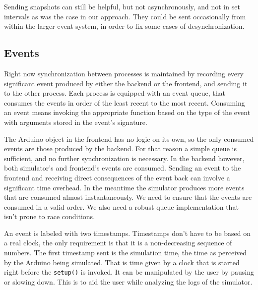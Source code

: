 

Sending snapshots can still be helpful, but not asynchronously, and not in set intervals as was the case in our approach. They could be sent occasionally from within the larger event system, in order to fix some cases of desynchronization.

\subsection{Events}\label{subsec:events}

Right now synchronization between processes is maintained by recording every significant event produced by either the backend or the frontend, and sending it to the other process. Each process is equipped with an event queue, that consumes the events in order of the least recent to the most recent. Consuming an event means invoking the appropriate function based on the type of the event with arguments stored in the event's signature. 

The Arduino object in the frontend has no logic on its own, so the only consumed events are those produced by the backend. For that reason a simple queue is sufficient, and no further synchronization is necessary. In the backend however, both simulator's and frontend's events are consumed. Sending an event to the frontend and receiving direct consequences of the event back can involve a significant time overhead. In the meantime the simulator produces more events that are consumed almost instantaneously. We need to ensure that the events are consumed in a valid order. We also need a robust queue implementation that isn't prone to race conditions.

An event is labeled with two timestamps. Timestamps don't have to be based on a real clock, the only requirement is that it is a non-decreasing sequence of numbers. The first timestamp sent is the simulation time, the time as perceived by the Arduino being simulated. That is time given by a clock that is started right before the \texttt{setup()} is invoked. It can be manipulated by the user by pausing or slowing down. This is to aid the user while analyzing the logs of the simulator.

